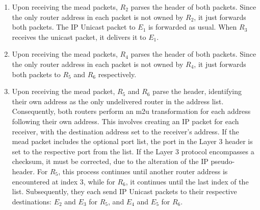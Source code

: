 \begin{enumerate}[label={(\arabic*)}]
\item
Upon receiving the \gls{mead} packets, $R_2$ parses the header of both packets.
Since the only router address in each packet is not owned by $R_2$, it just
    forwards both packets.
The IP Unicast packet to $E_1$ is forwarded as usual.
When $R_3$ receives the unicast packet, it delivers it to $E_1$.

\item
Upon receiving the \gls{mead} packets, $R_4$ parses the header of both packets.
Since the only router address in each packet is not owned by $R_4$, it just
    forwards both packets to $R_5$ and $R_6$ respectively.

\item
Upon receiving the \gls{mead} packet, $R_5$ and $R_6$ parse the header,
    identifying their own address as the only undelivered router in the address
    list.
Consequently, both routers perform an \gls{m2u} transformation for each address
    following their own address.
This involves creating an IP packet for each receiver, with the destination
    address set to the receiver's address.
If the \gls{mead} packet includes the optional port list, the port in the Layer
    3 header is set to the respective port from the list.
If the Layer 3 protocol encompasses a checksum, it must be corrected, due to
    the alteration of the IP pseudo-header.
For $R_5$, this process continues until another router address is encountered
at index 3, while for $R_6$, it continues until the last index of the list.
Subsequently, they each send IP Unicast packets to their respective
    destinations: $E_2$ and $E_3$ for $R_5$, and $E_4$ and $E_5$ for $R_6$.
\end{enumerate}


